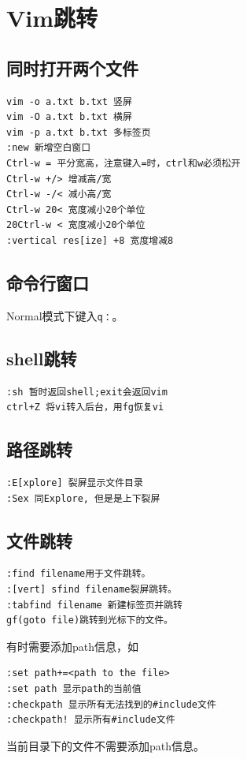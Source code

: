 {\section{Vim跳转}

\subsection{同时打开两个文件}
\begin{verbatim}
vim -o a.txt b.txt 竖屏
vim -O a.txt b.txt 横屏
vim -p a.txt b.txt 多标签页
:new 新增空白窗口
Ctrl-w = 平分宽高，注意键入=时，ctrl和w必须松开
Ctrl-w +/> 增减高/宽
Ctrl-w -/< 减小高/宽
Ctrl-w 20< 宽度减小20个单位
20Ctrl-w < 宽度减小20个单位
:vertical res[ize] +8 宽度增减8
\end{verbatim}

\subsection{命令行窗口}
Normal模式下键入\verb+q：+。

\subsection{shell跳转}
\begin{verbatim}
:sh 暂时返回shell;exit会返回vim
ctrl+Z 将vi转入后台，用fg恢复vi
\end{verbatim}

\subsection{路径跳转}
\begin{verbatim}
:E[xplore] 裂屏显示文件目录
:Sex 同Explore, 但是是上下裂屏
\end{verbatim}

\subsection{文件跳转}
\begin{verbatim}
:find filename用于文件跳转。
:[vert] sfind filename裂屏跳转。
:tabfind filename 新建标签页并跳转
gf(goto file)跳转到光标下的文件。
\end{verbatim}

有时需要添加path信息，如
\begin{verbatim}
:set path+=<path to the file>
:set path 显示path的当前值
:checkpath 显示所有无法找到的#include文件
:checkpath! 显示所有#include文件
\end{verbatim}
当前目录下的文件不需要添加path信息。

}
